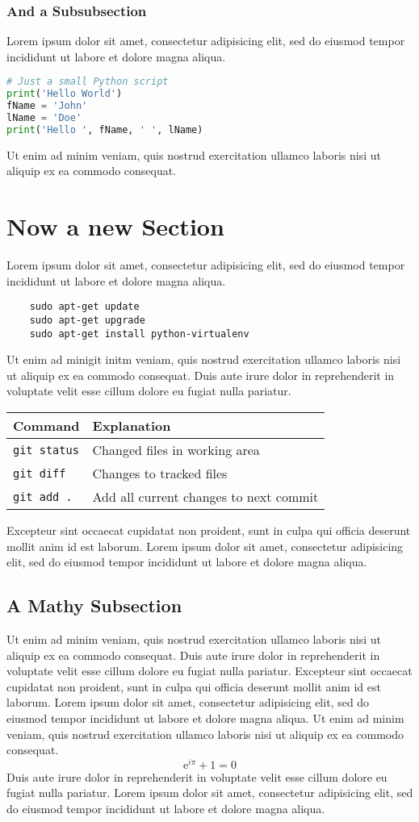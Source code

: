 \documentclass[blue]{modernCS}
\begin{document}
\subsubsection{And a Subsubsection}
Lorem ipsum dolor sit amet, consectetur adipisicing elit, sed do eiusmod
tempor incididunt ut labore et dolore magna aliqua.
\begin{lstlisting}[language=Python]
# Just a small Python script
print('Hello World')
fName = 'John'
lName = 'Doe'
print('Hello ', fName, ' ', lName)
\end{lstlisting}
Ut enim ad minim veniam,
quis nostrud exercitation ullamco laboris nisi ut aliquip ex ea commodo
consequat.

\section{Now a new Section}
Lorem ipsum dolor sit amet, consectetur adipisicing elit, sed do eiusmod
tempor incididunt ut labore et dolore magna aliqua.
\begin{lstlisting}
	sudo apt-get update
	sudo apt-get upgrade
	sudo apt-get install python-virtualenv
\end{lstlisting}
Ut enim ad minigit initm veniam,
quis nostrud exercitation ullamco laboris nisi ut aliquip ex ea commodo
consequat. Duis aute irure dolor in reprehenderit in voluptate velit esse
cillum dolore eu fugiat nulla pariatur.
\begin{center}
\begin{tabular}{ll}
\toprule
Command & Explanation \\
\midrule
\verb+git status+ & Changed files in working area \\
\verb+git diff+ & Changes to tracked files \\
\verb+git add .+ & Add all current changes to next commit \\
\bottomrule
\end{tabular}
\end{center}
Excepteur sint occaecat cupidatat non
proident, sunt in culpa qui officia deserunt mollit anim id est laborum.
Lorem ipsum dolor sit amet, consectetur adipisicing elit, sed do eiusmod
tempor incididunt ut labore et dolore magna aliqua.
\subsection{A Mathy Subsection}
Ut enim ad minim veniam,
quis nostrud exercitation ullamco laboris nisi ut aliquip ex ea commodo
consequat. Duis aute irure dolor in reprehenderit in voluptate velit esse
cillum dolore eu fugiat nulla pariatur. Excepteur sint occaecat cupidatat non
proident, sunt in culpa qui officia deserunt mollit anim id est laborum.
Lorem ipsum dolor sit amet, consectetur adipisicing elit, sed do eiusmod
tempor incididunt ut labore et dolore magna aliqua. Ut enim ad minim veniam,
quis nostrud exercitation ullamco laboris nisi ut aliquip ex ea commodo
consequat.
\[
\mathrm{e}^{i\pi} + 1 = 0
\]
Duis aute irure dolor in reprehenderit in voluptate velit esse
cillum dolore eu fugiat nulla pariatur.
Lorem ipsum dolor sit amet, consectetur adipisicing elit, sed do eiusmod
tempor incididunt ut labore et dolore magna aliqua.
\end{document}
